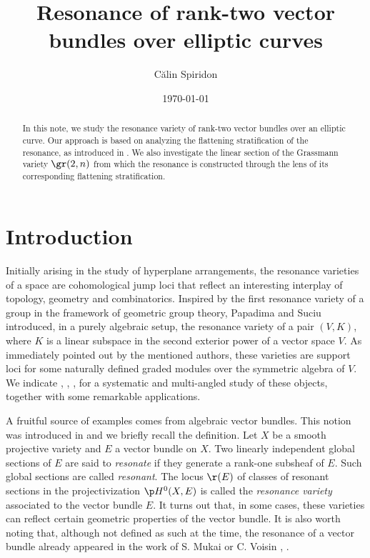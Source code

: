 \documentclass[10pt, leqno]{amsart}
\title{Resonance of rank-two vector bundles over elliptic curves}
\author{C\u alin Spiridon}
\date{\today}
\begin{document}
\begin{abstract}
In this note, we study the resonance variety of rank-two vector bundles over an elliptic curve. Our approach is based on analyzing the flattening stratification of the resonance, as introduced in \cite{aprodu_linear_2025}. We also investigate the linear section of the Grassmann variety $\gr(2,n)$ from which the resonance is constructed through the lens of its corresponding flattening stratification.
\end{abstract} 

\maketitle


\section{Introduction}

Initially arising in the study of hyperplane arrangements, the resonance varieties of a space are cohomological jump loci that reflect an interesting interplay of topology, geometry and combinatorics. 
Inspired by the first resonance variety of a group in the framework of geometric group theory, Papadima and Suciu \cite{papadima_vanishing_2015} introduced, in a purely algebraic setup, the resonance variety of a pair $(V,K)$, where $K$ is a linear subspace in the second exterior power of a vector space $V$. As immediately pointed out by the mentioned authors, these varieties are support loci for some naturally defined graded modules over the symmetric algebra of $V$. We indicate \cite{aprodu_green_2019}, \cite{aprodu_topological_2022}, \cite{aprodu_koszul_2024}, \cite{aprodu_reduced_2024} for a systematic and multi-angled study of these objects, together with some remarkable applications.

A fruitful source of examples comes from algebraic vector bundles. This notion was introduced in \cite{aprodu_koszul_2024} and we briefly recall the definition. Let $X$ be a smooth projective variety and $E$ a vector bundle on $X$. Two linearly independent global sections of $E$ are said to \emph{resonate} if they generate a rank-one subsheaf of $E$. Such global sections are called \emph{resonant}. The locus $\r(E)$ of classes of resonant sections in the projectivization $\p H^0(X,E)$ is called the \emph{resonance variety} associated to the vector bundle $E$. It turns out that, in some cases, these varieties can reflect certain geometric properties of the vector bundle. It is also worth noting that, although not defined as such at the time, the resonance of a vector bundle already appeared in the work of S. Mukai \cite{mukai_curves_1992} or C. Voisin \cite{voisin_greens_2002}, \cite{voisin_greens_2005}.
\end{document}
